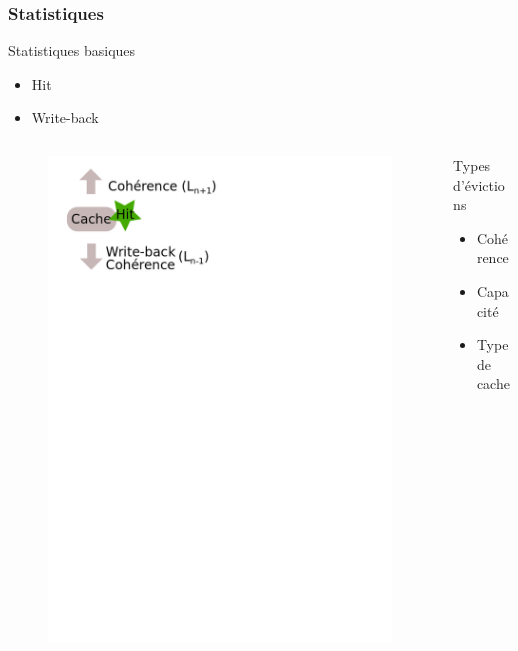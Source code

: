 \begin{frame}[fragile]
  \frametitle{Statistiques}
  
  \begin{block}{Statistiques basiques}
    \begin{itemize}
    \item{Hit}
    \item{Write-back}
    \end{itemize}
  \end{block}
  
  \begin{columns}[T]
    \begin{column}{.5\textwidth}
      \begin{figure}[h!]
	\includegraphics[scale=.4]{images/evictions.png}
      \end{figure}
    \end{column}
    \begin{column}{.5\textwidth}
      \bigskip
      \begin{block}{Types d'évictions}
	\begin{itemize}
	\item{Cohérence}
        \item{Capacité}
        \item{Type de cache         }
	\end{itemize}
      \end{block}
    \end{column}
  \end{columns}
\end{frame}

